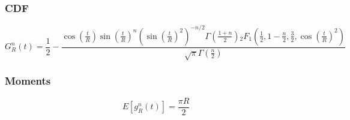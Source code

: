\subsubsection{CDF}
\begin{equation}
G_{R}^{n}(t)=\frac{1}{2}-\frac{\cos\left(\frac{t}{R}\right) \sin\left(\frac{t}{R}\right)^n \left(\sin\left(\frac{t}{R}\right)^2\right)^{-n/2}\Gamma\left(\frac{1+n}{2}\right) {}_{2}F_{1}\left(\frac{1}{2},1-\frac{n}{2},\frac{3}{2},\cos\left(\frac{t}{R}\right)^2\right) }  {\sqrt{\pi } \Gamma\left(\frac{n}{2}\right)}
\end{equation}

\subsubsection{Moments}

\begin{equation}
E[g_{R}^{n}(t)]=\frac{\pi R}{2}
\end{equation}



